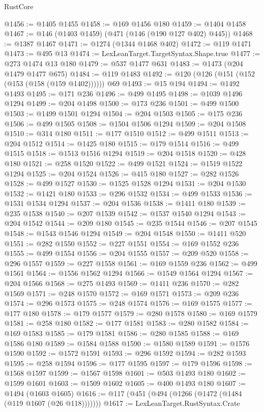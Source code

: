 \begin{lexlean}{RustCore}
\begin{coremodule}
@1456 := @1405 @1455
@1458 := @169 @1456 @180
@1459 := @1404 @1458
@1467 := @146 (@1403 @1459) (@471 (@146 (@190 @127 @402) @445))
@1468 := @1387 @1467
@1471 := @1274 (@1344 @1468 @402)
@1472 := @119 @1471
@1473 := @495 @13
@1474 := LexLeanTarget.TargetSyntax.Shape.true
@1477 := @273 @1474 @13 @180
@1479 := @537 @1477 @631
@1483 := @1473 (@204 @1479 @1477 @675)
@1484 := @119 @1483
@1492 := @120 (@126 (@151 (@152 (@153 (@158 (@159 @1402)))))) @69
@1493 := @15 @194
@1494 := @1492 @1493
@1495 := @171 @236
@1496 := @499 @1495
@1498 := @1039 @1496 @1294
@1499 := @204 @1498
@1500 := @173 @236
@1501 := @499 @1500
@1503 := @1499 @1501 @1294
@1504 := @204 @1503
@1505 := @175 @236
@1506 := @499 @1505
@1508 := @1504 @1506 @1294
@1509 := @204 @1508
@1510 := @314 @180
@1511 := @177 @1510
@1512 := @499 @1511
@1513 := @204 @1512
@1514 := @1425 @180
@1515 := @179 @1514
@1516 := @499 @1515
@1518 := @1513 @1516 @1294
@1519 := @204 @1518
@1520 := @428 @180
@1521 := @258 @1520
@1522 := @499 @1521
@1524 := @1519 @1522 @1294
@1525 := @204 @1524
@1526 := @415 @180
@1527 := @282 @1526
@1528 := @499 @1527
@1530 := @1525 @1528 @1294
@1531 := @204 @1530
@1532 := @1421 @180
@1533 := @296 @1532
@1534 := @499 @1533
@1536 := @1531 @1534 @1294
@1537 := @204 @1536
@1538 := @1411 @180
@1539 := @235 @1538
@1540 := @207 @1539
@1542 := @1537 @1540 @1294
@1543 := @204 @1542
@1544 := @209 @180
@1545 := @235 @1544
@1546 := @207 @1545
@1548 := @1543 @1546 @1294
@1549 := @204 @1548
@1550 := @1411 @520
@1551 := @282 @1550
@1552 := @227 @1551
@1554 := @169 @1552 @236
@1555 := @499 @1554
@1556 := @204 @1555
@1557 := @209 @520
@1558 := @296 @1557
@1559 := @227 @1558
@1561 := @169 @1559 @236
@1562 := @499 @1561
@1564 := @1556 @1562 @1294
@1566 := @1549 @1564 @1294
@1567 := @204 @1566
@1568 := @275 @1493
@1569 := @1411 @236
@1570 := @282 @1569
@1571 := @248 @1570
@1572 := @169 @1571
@1573 := @209 @236
@1574 := @296 @1573
@1575 := @248 @1574
@1576 := @169 @1575
@1577 := @177 @180
@1578 := @179 @1577
@1579 := @280 @1578
@1580 := @169 @1579
@1581 := @258 @180
@1582 := @177 @1581
@1583 := @280 @1582
@1584 := @169 @1583
@1585 := @179 @1581
@1586 := @280 @1585
@1588 := @169 @1586 @180
@1589 := @1584 @1588
@1590 := @1580 @1589
@1591 := @1576 @1590
@1592 := @1572 @1591
@1593 := @296 @1592
@1594 := @282 @1593
@1595 := @258 @1594
@1596 := @177 @1595
@1597 := @179 @1596
@1598 := @1568 @1597
@1599 := @1567 @1598
@1601 := @503 @1493 @180
@1602 := @1599 @1601
@1603 := @1509 @1602
@1605 := @400 @1493 @180
@1607 := @1494 (@1603 @1605)
@1616 := @117 (@451 (@494 (@1266 (@1472 (@1484 (@119 @1607 (@26 @118)))))))
@1617 := LexLeanTarget.RustSyntax.Crate

\end{coremodule}
\end{lexlean}
